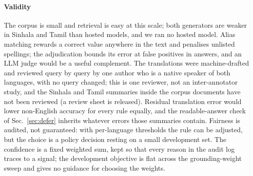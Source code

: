\paragraph{Validity} The corpus is small and retrieval is easy at this scale; both generators are weaker in Sinhala and Tamil than hosted models, and we ran no hosted model. Alias matching rewards a correct value anywhere in the text and penalises unlisted spellings; the adjudication bounds its error at \LAdjFP{} false positives in \LAdjN{} answers, and an LLM judge would be a useful complement. The translations were machine-drafted and reviewed query by query by one author who is a native speaker of both languages, with no query changed; this is one reviewer, not an inter-annotator study, and the Sinhala and Tamil summaries inside the corpus documents have not been reviewed (a review sheet is released). Residual translation error would lower non-English accuracy for every rule equally, and the readable-answer check of Sec.~\ref{sec:defer} inherits whatever errors those summaries contain. Fairness is audited, not guaranteed: with per-language thresholds the rule can be adjusted, but the choice is a policy decision resting on a small development set. The confidence is a fixed weighted sum, kept so that every reason in the audit log traces to a signal; the development objective is flat across the grounding-weight sweep and gives no guidance for choosing the weights.

